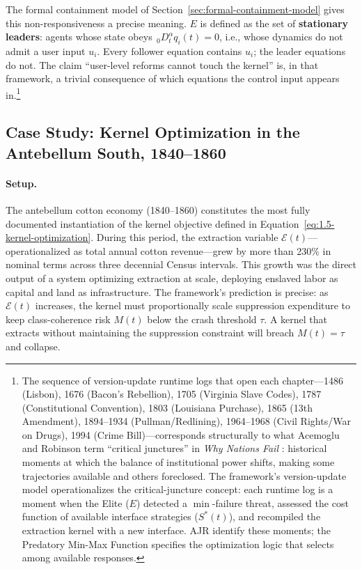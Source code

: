 The formal containment model of Section~\ref{sec:formal-containment-model} gives this non-responsiveness a precise meaning. $E$ is defined as the set of \textbf{stationary leaders}: agents whose state obeys ${}_{\,0}D_t^{\alpha} q_i(t) = 0$, i.e., whose dynamics do not admit a user input $u_i$. Every follower equation contains $u_i$; the leader equations do not. The claim ``user-level reforms cannot touch the kernel'' is, in that framework, a trivial consequence of which equations the control input appears in.\footnote{The sequence of version-update runtime logs that open each chapter---1486 (Lisbon), 1676 (Bacon's Rebellion), 1705 (Virginia Slave Codes), 1787 (Constitutional Convention), 1803 (Louisiana Purchase), 1865 (13th Amendment), 1894--1934 (Pullman/Redlining), 1964--1968 (Civil Rights/War on Drugs), 1994 (Crime Bill)---corresponds structurally to what Acemoglu and Robinson term ``critical junctures'' in \textit{Why Nations Fail} \cite{acemoglu_robinson}: historical moments at which the balance of institutional power shifts, making some trajectories available and others foreclosed. The framework's version-update model operationalizes the critical-juncture concept: each runtime log is a moment when the Elite ($E$) detected a $\min$-failure threat, assessed the cost function of available interface strategies ($S^\ast(t)$), and recompiled the extraction kernel with a new interface. AJR identify these moments; the Predatory Min-Max Function specifies the optimization logic that selects among available responses.}

\subsection*{Case Study: Kernel Optimization in the Antebellum South, 1840--1860}
\label{cs:kernel_antebellum}

\paragraph{Setup.}
The antebellum cotton economy (1840--1860) constitutes the most fully documented instantiation of the kernel objective defined in Equation~\ref{eq:1.5-kernel-optimization}. During this period, the extraction variable $\mathcal{E}(t)$---operationalized as total annual cotton revenue---grew by more than 230\% in nominal terms across three decennial Census intervals. This growth was the direct output of a system optimizing extraction at scale, deploying enslaved labor as capital and land as infrastructure. The framework's prediction is precise: as $\mathcal{E}(t)$ increases, the kernel must proportionally scale suppression expenditure to keep class-coherence risk $M(t)$ below the crash threshold $\tau$. A kernel that extracts without maintaining the suppression constraint will breach $M(t) = \tau$ and collapse.

